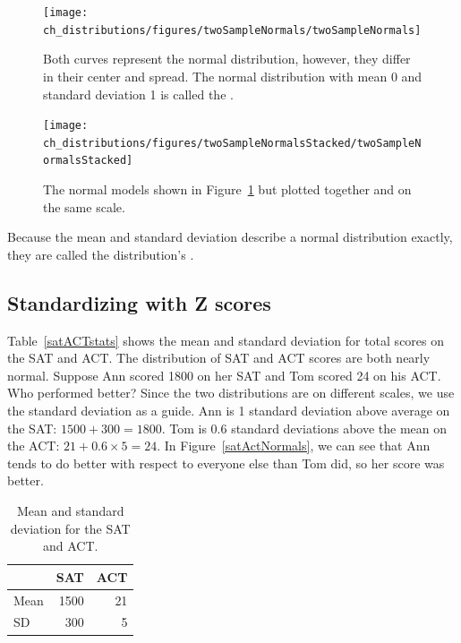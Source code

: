 \begin{figure}[hht]
\centering
\texttt{[image: ch\_distributions/figures/twoSampleNormals/twoSampleNormals]}
\caption{Both curves represent the normal distribution, however, they differ in their center and spread. The normal distribution with mean 0 and standard deviation 1 is called the .}
\label{twoSampleNormals}
\end{figure}

\begin{figure}[hht]
\centering
\texttt{[image: ch\_distributions/figures/twoSampleNormalsStacked/twoSampleNormalsStacked]}
\caption{The normal models shown in Figure~\ref{twoSampleNormals} but plotted together and on the same scale.}
\label{twoSampleNormalsStacked}
\end{figure}

Because the mean and standard deviation describe a normal distribution exactly, they are called the distribution's .


\subsection{Standardizing with Z scores}

\begin{example}{Table~\vref{satACTstats} shows the mean and standard deviation for total scores on the SAT and ACT. The distribution of SAT and ACT scores are both nearly normal. Suppose Ann scored 1800 on her SAT and Tom scored 24 on his ACT. Who performed better?}\label{actSAT}
Since the two distributions are on different scales, we use the standard deviation as a guide. Ann is 1 standard deviation above average on the SAT: $1500 + 300=1800$. Tom is 0.6 standard deviations above the mean on the ACT: $21+0.6\times 5=24$. In Figure~\ref{satActNormals}, we can see that Ann tends to do better with respect to everyone else than Tom did, so her score was better.
\end{example}

\begin{table}
\centering
\begin{tabular}{l r r}
  \hline
  & SAT & ACT \\
  \hline
Mean \hspace{0.3cm} & 1500 & 21 \\
SD & 300 & 5 \\
   \hline
\end{tabular}
\caption{Mean and standard deviation for the SAT and ACT.}
\label{satACTstats}
\end{table}

